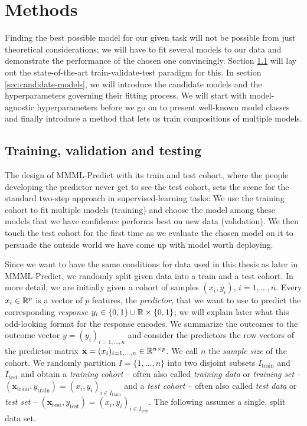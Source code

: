 \chapter{Methods} \label{chap:methods}

Finding the best possible model for our given task will not be possible from just theoretical 
considerations; we will have to fit several models to our data and demonstrate the performance of 
the chosen one convincingly. Section \ref{sec:train-val-test} will lay out the state-of-the-art 
train-validate-test paradigm for this. In section \ref{sec:candidate-models}, we will introduce 
the candidate models and the hyperparameters governing their fitting process. We will start with 
model-agnostic hyperparameters before we go on to present well-known model classes and finally 
introduce a method that lets us train compositions of multiple models.

\section{Training, validation and testing}\label{sec:train-val-test}

The design of MMML-Predict with its train and test cohort, where the people developing the predictor 
never get to see the test cohort, sets the scene for the standard two-step approach in 
supervised-learning tasks: We use the training cohort to fit multiple models (training) and choose the model
among these models that we have confidence performs best on new data (validation). We then touch 
the test cohort for the first time as we evaluate the chosen model on it to persuade the outside 
world we have come up with model worth deploying.

Since we want to have the same conditions for data used in this thesis as later in MMML-Predict,
we randomly split given data into a train and a test cohort. In more detail, we are initially given 
a cohort of samples $(x_i, y_i)$, $i = 1, \ldots, n$. Every $x_i \in \mathbb{R}^p$ is a vector of $p$ 
features, the \textit{predictor}, that we want to use to predict the corresponding \textit{response} 
$y_i \in \{0, 1\} \cup \mathbb{R} \times 
\{0, 1\}$; we will explain later what this odd-looking format for the response encodes. We summarize the 
outcomes to the outcome vector $y = (y_i)_{i = 1, \ldots, n}$ and consider the predictors the row 
vectors of the predictor matrix $\mathbf{x} = (x_i)_{i = 1, \ldots, n} \in \mathbb{R}^{n \times p}$. We 
call $n$ the \textit{sample size} of the cohort. We randomly partition $I = \{1, \ldots, n\}$ into two 
disjoint subsets $I_\text{train}$ and $I_\text{test}$ and obtain a \textit{training cohort} -- often 
also called \textit{training data} or \textit{training set} --
$(\mathbf{x}_\text{train}, y_\text{train}) = (x_i, y_i)_{i \in I_\text{train}}$ and a \textit{test 
cohort} -- often also called \textit{test data} or \textit{test set} -- 
$(\mathbf{x}_\text{test}, y_\text{test}) = (x_i, y_i)_{i \in I_\text{test}}$. The following assumes 
a single, split data set.

